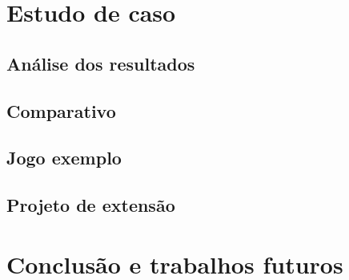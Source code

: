 \documentclass[12pt,twoside,openright,a4paper,english,brazil,sumario=tradicional]{abntex2}
\begin{document}
\chapter{Estudo de caso}
\label{chap:caso}
\section{Análise dos resultados}
\section{Comparativo}
\section{Jogo exemplo}
\section{Projeto de extensão}

\chapter{Conclusão e trabalhos futuros}
\label{chap:conclcsao}

\postextual

\end{document}
